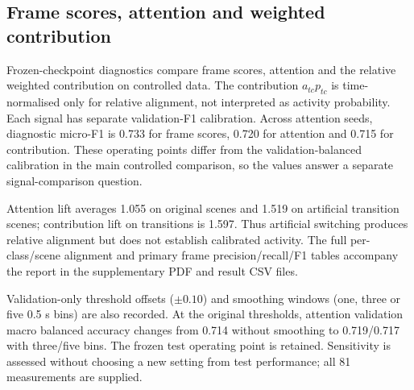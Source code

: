 \subsection{Frame scores, attention and weighted contribution}
Frozen-checkpoint diagnostics compare frame scores, attention and the relative weighted contribution on controlled data. The contribution $a_{tc}p_{tc}$ is time-normalised only for relative alignment, not interpreted as activity probability. Each signal has separate validation-F1 calibration. Across attention seeds, diagnostic micro-F1 is 0.733 for frame scores, 0.720 for attention and 0.715 for contribution. These operating points differ from the validation-balanced calibration in the main controlled comparison, so the values answer a separate signal-comparison question.

Attention lift averages 1.055 on original scenes and 1.519 on artificial transition scenes; contribution lift on transitions is 1.597. Thus artificial switching produces relative alignment but does not establish calibrated activity. The full per-class/scene alignment and primary frame precision/recall/F1 tables accompany the report in the supplementary PDF and result CSV files.

Validation-only threshold offsets ($\pm0.10$) and smoothing windows (one, three or five 0.5 s bins) are also recorded. At the original thresholds, attention validation macro balanced accuracy changes from 0.714 without smoothing to 0.719/0.717 with three/five bins. The frozen test operating point is retained. Sensitivity is assessed without choosing a new setting from test performance; all 81 measurements are supplied.
